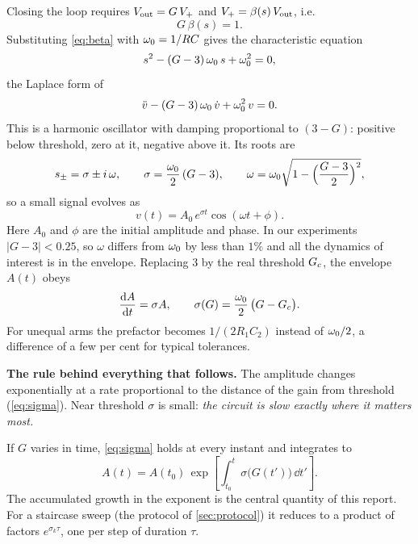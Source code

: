 Closing the loop requires $V_{\mathrm{out}} = G\,V_{+}$ and $V_{+}=\beta(s)\,V_{\mathrm{out}}$, i.e.
\begin{equation}
  G\,\beta(s) = 1 .
  \label{eq:loop}
\end{equation}
Substituting \cref{eq:beta} with $\omega_{0}=1/RC$ gives the characteristic equation
\begin{equation}
  s^{2} - (G-3)\,\omega_{0}\,s + \omega_{0}^{2} = 0 ,
  \label{eq:char}
\end{equation}
the Laplace form of
\begin{equation}
  \ddot{v} - (G-3)\,\omega_{0}\,\dot{v} + \omega_{0}^{2}\,v = 0 .
  \label{eq:ode}
\end{equation}
This is a harmonic oscillator with damping proportional to $(3-G)$: positive below threshold, zero at
it, negative above it. Its roots are
\begin{equation}
  s_{\pm} = \sigma \pm i\,\omega, \qquad
  \sigma = \frac{\omega_{0}}{2}\,(G-3), \qquad
  \omega = \omega_{0}\sqrt{1-\Bigl(\frac{G-3}{2}\Bigr)^{2}} ,
  \label{eq:roots}
\end{equation}
so a small signal evolves as
\begin{equation}
  v(t) = A_{0}\,e^{\sigma t}\cos(\omega t + \phi) .
  \label{eq:solution}
\end{equation}
Here $A_{0}$ and $\phi$ are the initial amplitude and phase. In our experiments $|G-3|<0.25$, so
$\omega$ differs from $\omega_{0}$ by less than $1\%$ and all the dynamics of interest is in the envelope.
Replacing 3 by the real threshold $G_{c}$, the envelope $A(t)$ obeys
\begin{equation}
  \frac{\mathrm{d} A}{\mathrm{d} t} = \sigma A, \qquad \sigma(G) = \frac{\omega_{0}}{2}\,\bigl(G-G_{c}\bigr) .
  \label{eq:sigma}
\end{equation}
For unequal arms the prefactor becomes $1/(2R_{1}C_{2})$ instead of $\omega_{0}/2$, a difference of a few per
cent for typical tolerances.

\begin{keybox}
\textbf{The rule behind everything that follows.} The amplitude changes exponentially at a rate
proportional to the distance of the gain from threshold (\cref{eq:sigma}). Near threshold $\sigma$ is
small: \emph{the circuit is slow exactly where it matters most.}
\end{keybox}

If $G$ varies in time, \cref{eq:sigma} holds at every instant and integrates to
\begin{equation}
  A(t) = A(t_{0})\,\exp\!\left[\int_{t_{0}}^{t}\sigma\bigl(G(t')\bigr)\,\dd t'\right] .
  \label{eq:envelope}
\end{equation}
The accumulated growth in the exponent is the central quantity of this report. For a staircase
sweep (the protocol of \cref{sec:protocol}) it reduces to a product of factors $e^{\sigma_{k}\tau}$, one per step of duration $\tau$.

